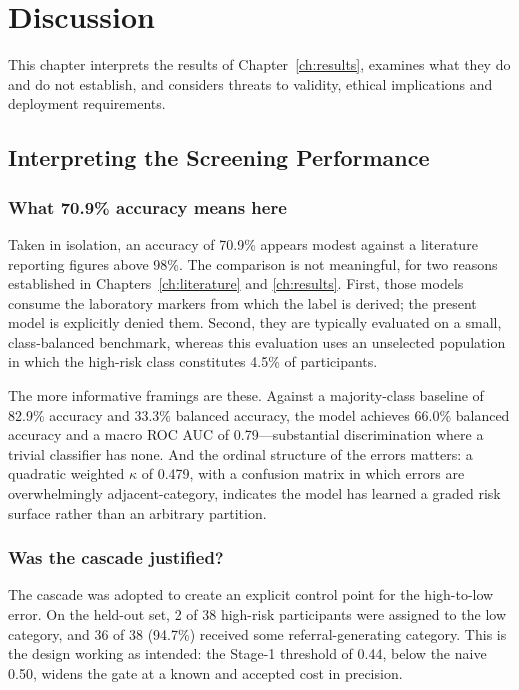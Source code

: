 \chapter{Discussion}
\label{ch:discussion}

This chapter interprets the results of Chapter~\ref{ch:results}, examines what
they do and do not establish, and considers threats to validity, ethical
implications and deployment requirements.

\section{Interpreting the Screening Performance}
\label{sec:disc_ml}

\subsection{What 70.9\% accuracy means here}

Taken in isolation, an accuracy of 70.9\% appears modest against a literature
reporting figures above 98\%. The comparison is not meaningful, for two reasons
established in Chapters~\ref{ch:literature} and \ref{ch:results}. First, those
models consume the laboratory markers from which the label is derived; the
present model is explicitly denied them. Second, they are typically evaluated on
a small, class-balanced benchmark, whereas this evaluation uses an unselected
population in which the high-risk class constitutes 4.5\% of participants.

The more informative framings are these. Against a majority-class baseline of
82.9\% accuracy and 33.3\% balanced accuracy, the model achieves 66.0\% balanced
accuracy and a macro ROC AUC of 0.79---substantial discrimination where a
trivial classifier has none. And the ordinal structure of the errors matters: a
quadratic weighted $\kappa$ of 0.479, with a confusion matrix in which errors are
overwhelmingly adjacent-category, indicates the model has learned a graded risk
surface rather than an arbitrary partition.

\subsection{Was the cascade justified?}

The cascade was adopted to create an explicit control point for the high-to-low
error. On the held-out set, 2 of 38 high-risk participants were assigned to the
low category, and 36 of 38 (94.7\%) received some referral-generating category.
This is the design working as intended: the Stage-1 threshold of 0.44, below the
naive 0.50, widens the gate at a known and accepted cost in precision.

